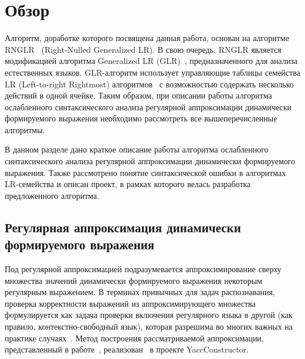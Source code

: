 
\section{Обзор}
Алгоритм, доработке которого посвящена данная работа, основан на алгоритме RNGLR~\cite{RNGLR} (Right-Nulled Generalized LR). В свою очередь, RNGLR является модификацией алгоритма Generalized LR (GLR)~\cite{Tomita}, предназначенного для анализа естественных языков. GLR-алгоритм использует управляющие таблицы семейства LR (Left-to-right Rightmost) алгоритмов~\cite{Grune} с возможностью содержать несколько действий в одной ячейке. Таким образом, при описании работы алгоритма ослабленного синтаксического анализа регулярной аппроксимации динамически формируемого выражения необходимо рассмотреть все вышеперечисленные алгоритмы.

В данном разделе дано краткое описание работы алгоритма ослабленного синтаксического анализа регулярной аппроксимации динамически формируемого выражения. Также рассмотрено понятие синтаксической ошибки в алгоритмах LR-семейства и описан проект, в рамках которого велась разработка предложенного алгоритма.

\subsection{Регулярная аппроксимация динамически формируемого выражения}
Под регулярной аппроксимацией подразумевается аппроксимирование сверху множества значений динамически формируемого выражения некоторым регулярным выражением. В терминах привычных для задач распознавания, проверка корректности выражений из аппроксимирующего множества формулируется как задача проверки включения регулярного языка в другой (как правило, контекстно-свободный язык), которая разрешима во многих важных на практике случаях~\cite{LangInclusion}. Метод построения рассматриваемой аппроксимации, представленный в работе~\cite{RegOverApprox}, реализован~\cite{YCregapprox} в проекте YaccConstructor.

